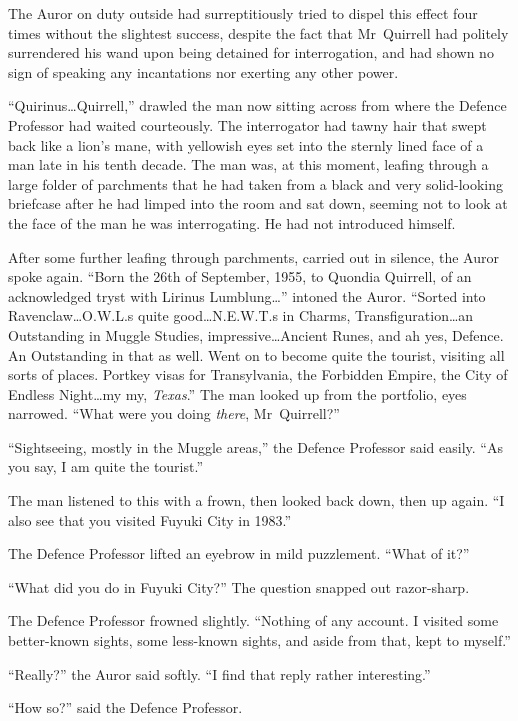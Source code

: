 The Auror on duty outside had surreptitiously tried to dispel this effect four times without the slightest success, despite the fact that Mr~Quirrell had politely surrendered his wand upon being detained for interrogation, and had shown no sign of speaking any incantations nor exerting any other power.

“Quirinus…Quirrell,” drawled the man now sitting across from where the Defence Professor had waited courteously. The interrogator had tawny hair that swept back like a lion’s mane, with yellowish eyes set into the sternly lined face of a man late in his tenth decade. The man was, at this moment, leafing through a large folder of parchments that he had taken from a black and very solid-looking briefcase after he had limped into the room and sat down, seeming not to look at the face of the man he was interrogating. He had not introduced himself.

After some further leafing through parchments, carried out in silence, the Auror spoke again. “Born the 26th of September, 1955, to Quondia Quirrell, of an acknowledged tryst with Lirinus Lumblung…” intoned the Auror. “Sorted into Ravenclaw…O.W.L.s quite good…N.E.W.T.s in Charms, Transfiguration…an Outstanding in Muggle Studies, impressive…Ancient Runes, and ah yes, Defence. An Outstanding in that as well. Went on to become quite the tourist, visiting all sorts of places. Portkey visas for Transylvania, the Forbidden Empire, the City of Endless Night…my my, \emph{Texas}.” The man looked up from the portfolio, eyes narrowed. “What were you doing \emph{there}, Mr~Quirrell?”

“Sightseeing, mostly in the Muggle areas,” the Defence Professor said easily. “As you say, I am quite the tourist.”

The man listened to this with a frown, then looked back down, then up again. “I also see that you visited Fuyuki City in 1983.”

The Defence Professor lifted an eyebrow in mild puzzlement. “What of it?”

“What did you do in Fuyuki City?” The question snapped out razor-sharp.

The Defence Professor frowned slightly. “Nothing of any account. I visited some better-known sights, some less-known sights, and aside from that, kept to myself.”

“Really?” the Auror said softly. “I find that reply rather interesting.”

“How so?” said the Defence Professor.

